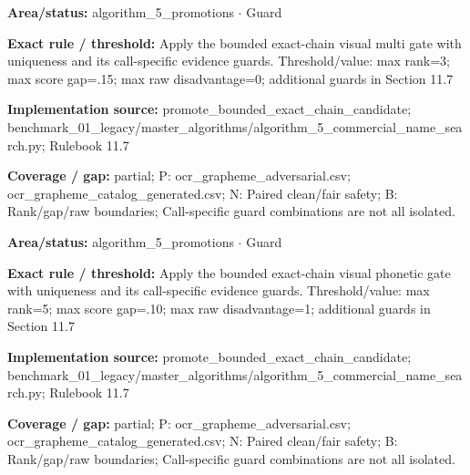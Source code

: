 \begin{tcolorbox}[enhanced,breakable,colback=white,colframe=Muted!45,boxrule=0.45pt,arc=1.5pt,left=6pt,right=6pt,top=5pt,bottom=5pt,title={\texttt{A5-CHAIN-VISUAL-MULTI}},title after break={\texttt{A5-CHAIN-VISUAL-MULTI}\ (continued)},fonttitle=\headingfont\bfseries\color{Navy},coltitle=Navy]
\textbf{Area/status:} algorithm\_\allowbreak{}5\_\allowbreak{}promotions $\boldsymbol{\cdot}$ Guard\par
\smallskip
\textbf{Exact rule / threshold:} Apply the bounded exact-chain visual multi gate with uniqueness and its call-specific evidence guards. Threshold/\allowbreak{}value: max rank=3; max score gap=.15; max raw disadvantage=0; additional guards in Section 11.7\par
\smallskip
\textbf{Implementation source:} promote\_\allowbreak{}bounded\_\allowbreak{}exact\_\allowbreak{}chain\_\allowbreak{}candidate; benchmark\_\allowbreak{}01\_\allowbreak{}legacy/\allowbreak{}master\_\allowbreak{}algorithms/\allowbreak{}algorithm\_\allowbreak{}5\_\allowbreak{}commercial\_\allowbreak{}name\_\allowbreak{}search.py; Rulebook 11.7\par
\smallskip
\textbf{Coverage / gap:} partial; P: ocr\_\allowbreak{}grapheme\_\allowbreak{}adversarial.csv; ocr\_\allowbreak{}grapheme\_\allowbreak{}catalog\_\allowbreak{}generated.csv; N: Paired clean/\allowbreak{}fair safety; B: Rank/\allowbreak{}gap/\allowbreak{}raw boundaries; Call-specific guard combinations are not all isolated.
\end{tcolorbox}
\begin{tcolorbox}[enhanced,breakable,colback=white,colframe=Muted!45,boxrule=0.45pt,arc=1.5pt,left=6pt,right=6pt,top=5pt,bottom=5pt,title={\texttt{A5-CHAIN-VISUAL-PHONETIC}},title after break={\texttt{A5-CHAIN-VISUAL-PHONETIC}\ (continued)},fonttitle=\headingfont\bfseries\color{Navy},coltitle=Navy]
\textbf{Area/status:} algorithm\_\allowbreak{}5\_\allowbreak{}promotions $\boldsymbol{\cdot}$ Guard\par
\smallskip
\textbf{Exact rule / threshold:} Apply the bounded exact-chain visual phonetic gate with uniqueness and its call-specific evidence guards. Threshold/\allowbreak{}value: max rank=5; max score gap=.10; max raw disadvantage=1; additional guards in Section 11.7\par
\smallskip
\textbf{Implementation source:} promote\_\allowbreak{}bounded\_\allowbreak{}exact\_\allowbreak{}chain\_\allowbreak{}candidate; benchmark\_\allowbreak{}01\_\allowbreak{}legacy/\allowbreak{}master\_\allowbreak{}algorithms/\allowbreak{}algorithm\_\allowbreak{}5\_\allowbreak{}commercial\_\allowbreak{}name\_\allowbreak{}search.py; Rulebook 11.7\par
\smallskip
\textbf{Coverage / gap:} partial; P: ocr\_\allowbreak{}grapheme\_\allowbreak{}adversarial.csv; ocr\_\allowbreak{}grapheme\_\allowbreak{}catalog\_\allowbreak{}generated.csv; N: Paired clean/\allowbreak{}fair safety; B: Rank/\allowbreak{}gap/\allowbreak{}raw boundaries; Call-specific guard combinations are not all isolated.
\end{tcolorbox}
